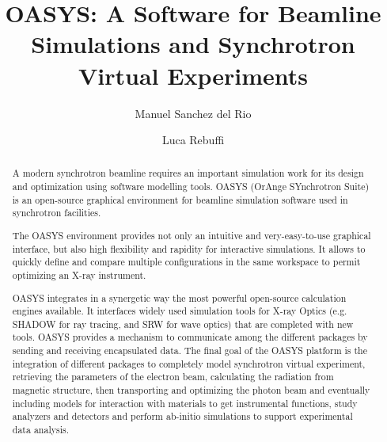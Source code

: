 \documentclass{aip-cp}
\begin{document}
\title{OASYS: A Software for Beamline Simulations and Synchrotron Virtual Experiments}

\author[aff1]{Manuel Sanchez del Rio} %
\author[aff2]{Luca Rebuffi}


\maketitle


\begin{abstract}
A modern synchrotron beamline requires an important simulation work for its design and optimization using software modelling tools. OASYS (OrAnge SYnchrotron Suite) is an open-source graphical environment for beamline simulation software used in synchrotron facilities.

The OASYS environment provides not only an intuitive and very-easy-to-use graphical interface, but also high flexibility and rapidity for interactive simulations. It allows to quickly define and compare multiple configurations in the same workspace to permit optimizing an X-ray instrument. 

OASYS integrates in a synergetic way the most powerful open-source calculation engines available. It interfaces widely used simulation tools for X-ray Optics (e.g. SHADOW for ray tracing, and SRW for wave optics) that are completed with new tools. OASYS provides a mechanism to communicate among the different packages by sending and receiving encapsulated data. The final goal of the OASYS platform is the integration of different packages to completely model synchrotron virtual experiment, retrieving the parameters of the electron beam, calculating the radiation from magnetic structure, then transporting and optimizing the photon beam and eventually including models for interaction with materials to get instrumental functions, study analyzers and detectors and perform ab-initio simulations to support experimental data analysis. 


\end{abstract}
\end{document}
